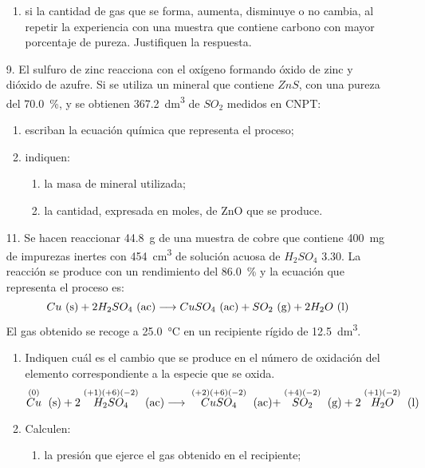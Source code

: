 \documentclass[../practica.root.tex]{subfiles}
\begin{document}
\begin{enumerate}
\begin{enumerate}
              \item si la cantidad de gas que se forma, aumenta, disminuye o no cambia,
                    al repetir la experiencia con una muestra que contiene carbono con mayor
                    porcentaje de pureza. Justifiquen la respuesta. \\
          \end{enumerate}


    \item[9.] El sulfuro de zinc reacciona con el oxígeno formando óxido de zinc y dióxido de azufre.
          Si se utiliza un mineral que contiene $ZnS$, con una pureza del \SI{70,0}{\percent}, y se obtienen
          \SI{367,2}{\dm\cubed} de $SO_2$ medidos en CNPT:
          \begin{enumerate}
              \item escriban la ecuación química que representa el proceso;
              \item indiquen:
                    \begin{enumerate}
                        \item la masa de mineral utilizada;
                        \item la cantidad, expresada en moles, de ZnO que se produce.
                    \end{enumerate}
          \end{enumerate}

    \item[11.] Se hacen reaccionar \SI{44,8}{\g} de una muestra de cobre que contiene \SI{400}{\mg} de impurezas
          inertes con \SI{454}{\cm\cubed} de solución acuosa de $H_2SO_4$ \SI{3,30}{\MR}. La reacción se produce con un
          rendimiento del \SI{86,0}{\percent} y la ecuación que representa el proceso es:
          \[ Cu \ \text{(s)} + 2 H_2SO_4 \ \text{(ac)} \longrightarrow{} CuSO_4 \ \text{(ac)} + SO_2 \ \text{(g)} + 2 H_2O \ \text{(l)} \]
          El gas obtenido se recoge a \SI{25,0}{\celsius} en un recipiente rígido de \SI{12,5}{\dm\cubed}.
          \begin{enumerate}
              \item Indiquen cuál es el cambio que se produce en el número de oxidación del elemento
                    correspondiente a la especie que se oxida.
                    \[ \stackrel{(0)}{Cu} \ \text{(s)} + 2 \stackrel{(+1)(+6)(-2)}{H_2SO_4} \ \text{(ac)}
                        \longrightarrow{} \stackrel{(+2)(+6)(-2)}{CuSO_4} \ \text{(ac)} + \stackrel{(+4)(-2)}{SO_2} \ \text{(g)} + 2 \stackrel{(+1)(-2)}{H_2O} \ \text{(l)} \]
              \item Calculen:
                    \begin{enumerate}[label=\roman*)]
                        \item la presión que ejerce el gas obtenido en el recipiente;


\end{enumerate}
\end{enumerate}
\end{enumerate}
\end{document}
